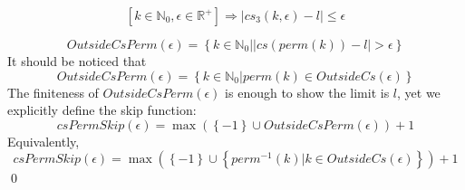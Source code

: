 \documentclass[]{article}
\newcommand{\pqty}[1]{{\left(#1\right)}}
\newcommand{\Bqty}[1]{{\left\{#1\right\}}}
\newcommand{\bqty}[1]{{\left[#1\right]}}
\newcommand{\abs}[1]{{\left\lvert#1\right\rvert}}
\numberwithin{equation}{section}
\begin{document}
	\begin{equation}
		\bqty{k\in\mathbb{N}_0,\epsilon\in\mathbb{R}^+}\Rightarrow \abs{cs_3\pqty{k,\epsilon}-l}\leq\epsilon
	\end{equation}

	\begin{equation}
		OutsideCsPerm\pqty{\epsilon}=\Bqty{k\in\mathbb{N}_0|\abs{cs\pqty{perm\pqty{k}}-l}>\epsilon}
	\end{equation}
	It should be noticed that
	\begin{equation}
		OutsideCsPerm\pqty{\epsilon}=\Bqty{k\in\mathbb{N}_0|perm\pqty{k}\in OutsideCs\pqty{\epsilon}}
	\end{equation}
	The finiteness of $OutsideCsPerm\pqty{\epsilon}$ is enough to show the limit is $l$, yet we explicitly define the skip function:
	\begin{equation}
		csPermSkip\pqty{\epsilon}=\max\pqty{\Bqty{-1}\cup OutsideCsPerm\pqty{\epsilon}}+1
	\end{equation}
	Equivalently, 
	\begin{equation}
		csPermSkip\pqty{\epsilon}=\max\pqty{\Bqty{-1}\cup \Bqty{perm^{-1}\pqty{k}|k\in OutsideCs\pqty{\epsilon}}}+1
	\end{equation}
	\qed
\end{document}
